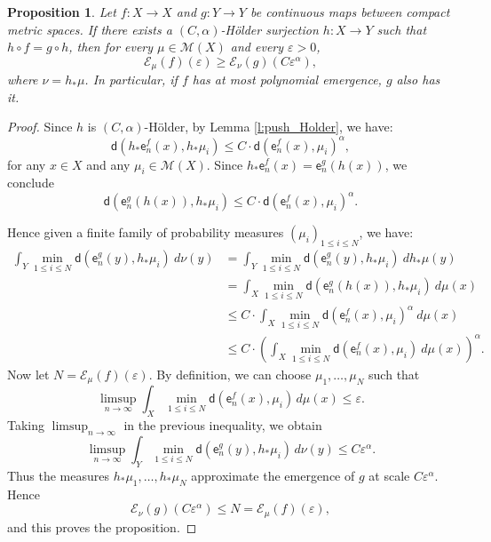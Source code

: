 \documentclass[11pt,reqno]{amsart}
\theoremstyle{plain}
\newtheorem{prop}[theorem]{Proposition}
\theoremstyle{definition}
\theoremstyle{remark}
\theoremstyle{plain}
\numberwithin{equation}{section}
\newcommand{\eps}{\varepsilon}
\begin{document}
\begin{prop} \label{lemma lipschitz preserva emergencia}
Let $f\colon X \to X$ and $g\colon Y \to Y$ be continuous maps between compact metric spaces. If there exists a $(C,\alpha)$-H\"older surjection $h\colon X \to Y$ such that $h\circ f=g\circ h$, then for every $\mu \in \mathcal{M}(X)$ and every $\eps>0$,  
$$\mathcal{E}_{\mu}(f)( \eps)\geq \mathcal{E}_{\nu}(g)(C\eps^\alpha),$$ 
where $\nu=h_{\ast}\mu$. In particular, if $f$ has at most polynomial emergence, $g$ also has it. 
\end{prop}
\begin{proof}
							Since $h$ is $(C,\alpha)$-H\"older, by Lemma \ref{l:push_Holder}, we have:
							$$\mathsf{d}(h_{\ast}\mathsf{e}_{n}^{f}(x),h_{\ast}\mu_{i})\leq C \cdot \mathsf{d}(\mathsf{e}_{n}^{f}(x),\mu_{i})^\alpha,$$ for any $x\in X$ and any $\mu_{i}\in \mathcal{M}(X)$. Since $h_{\ast}\mathsf{e}_{n}^{f}(x)=\mathsf{e}^{g}_{n}(h(x))$, we conclude  
							$$\mathsf{d}(\mathsf{e}^{g}_{n}(h(x)),h_{\ast}\mu_{i})\leq C \cdot \mathsf{d}(\mathsf{e}_{n}^{f}(x),\mu_{i})^\alpha.$$ 

							Hence given a finite family of probability measures $(\mu_i)_{1\le i \le N}$, we have:
							\begin{align*}
								\int_{Y} \min_{1\leq i\leq N}{\mathsf{d}(\mathsf{e}_{n}^{g}(y),h_{\ast}\mu_{i})} \ d\nu(y)& =   \int_{Y} \min_{1\leq i\leq N}{\mathsf{d}(\mathsf{e}_{n}^{g}(y),h_{\ast}\mu_{i})} \ dh_{\ast}\mu(y)\\
								& = \int_{X} \min_{1\leq i\leq N}{\mathsf{d}(\mathsf{e}_{n}^{g}(h(x)),h_{\ast}\mu_{i})} \ d\mu(x)\\
								&\le C \cdot   \int_{X} \min_{1\leq i\leq N} \mathsf{d}(\mathsf{e}_{n}^{f}(x),\mu_{i})^\alpha\ d\mu(x)\\
								&\le C \cdot  \left(  \int_{X} \min_{1\leq i\leq N} \mathsf{d}(\mathsf{e}_{n}^{f}(x),\mu_{i})\ d\mu(x)\right)^\alpha.
							\end{align*} 
							Now let $N=\mathcal{E}_{\mu}(f)(\varepsilon)$. By definition, we can choose
$\mu_1,\dots,\mu_N$ such that
\begin{equation*}
\limsup_{n\to\infty}
\int_{X}
\min_{1\leq i\leq N}
\mathsf{d}(\mathsf{e}_{n}^{f}(x),\mu_i)\,d\mu(x)
\leq \varepsilon.
\end{equation*}
Taking $\limsup_{n\to\infty}$ in the previous inequality, we obtain
\begin{equation*}
\limsup_{n\to\infty}
\int_{Y}
\min_{1\leq i\leq N}
\mathsf{d}(\mathsf{e}_{n}^{g}(y),h_{\ast}\mu_i)\,d\nu(y)
\leq C\varepsilon^\alpha.
\end{equation*}
Thus the measures $h_{\ast}\mu_1,\dots,h_{\ast}\mu_N$ approximate the
emergence of $g$ at scale $C\varepsilon^\alpha$. Hence
\begin{equation*}
\mathcal{E}_{\nu}(g)(C\varepsilon^\alpha)
\leq
N
=
\mathcal{E}_{\mu}(f)(\varepsilon),
\end{equation*}
and this proves the proposition.
\end{proof}
						
\end{document}
